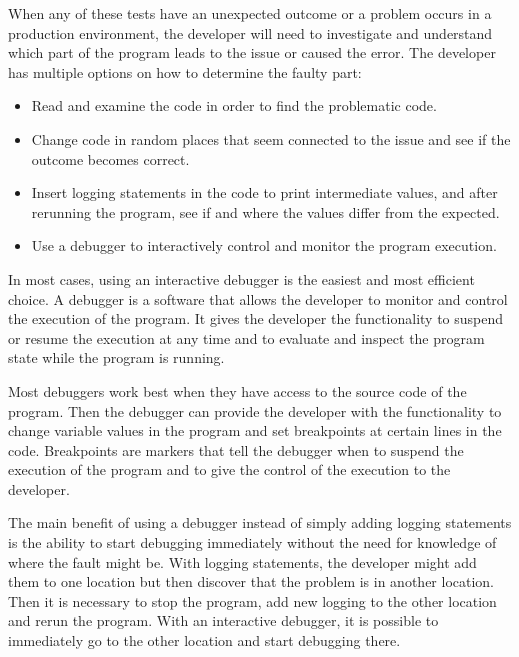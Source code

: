 \documentclass[..thesis.tex]{subfiles}
\begin{document}
When any of these tests have an unexpected outcome or a problem occurs in a production environment, the developer will need to investigate and understand which part of the program leads to the issue or caused the error.
The developer has multiple options on how to determine the faulty part:
\begin{itemize}
  \item Read and examine the code in order to find the problematic code.
  \item Change code in random places that seem connected to the issue and see if the outcome becomes correct.
  \item Insert logging statements in the code to print intermediate values, and after rerunning the program, see if and where the values differ from the expected.
  \item Use a debugger to interactively control and monitor the program execution.
\end{itemize}

In most cases, using an interactive debugger is the easiest and most efficient choice. 
A debugger is a software that allows the developer to monitor and control the execution of the program.
% 
% 
It gives the developer the functionality to suspend or resume the execution at any time and to evaluate and inspect the program state while the program is running. 

Most debuggers work best when they have access to the source code of the program. 
Then the debugger can provide the developer with the functionality to change variable values in the program and set breakpoints at certain lines in the code. 
Breakpoints are markers that tell the debugger when to suspend the execution of the program and to give the control of the execution to the developer.

The main benefit of using a debugger instead of simply adding logging statements is the ability to start debugging immediately without the need for knowledge of where the fault might be.
With logging statements, the developer might add them to one location but then discover that the problem is in another location. 
Then it is necessary to stop the program, add new logging to the other location and rerun the program.
With an interactive debugger, it is possible to immediately go to the other location and start debugging there.
\end{document}

